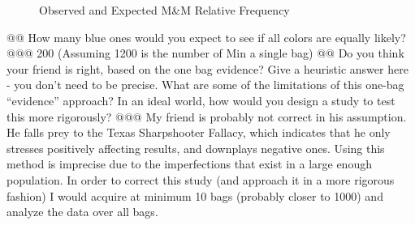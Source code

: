 \documentclass[10pt]{article}
\begin{document}
\begin{easylist}[enumerate]
\begin{figure}[ht]
            \caption{Observed and Expected M\&M Relative Frequency}
            \label{fig:mnms}
        \end{figure}
    @@ How many blue ones would you expect to see if all colors are equally likely?
    @@@ 200 (Assuming 1200 is the number of M\@Ms in a single bag)
    @@ Do you think your friend is right, based on the one bag evidence? Give a heuristic answer here - you don't need to be precise. What are some of the limitations of this one-bag ``evidence'' approach? In an ideal world, how would you design a study to test this more rigorously?
    @@@ My friend is probably not correct in his assumption. He falls prey to the Texas Sharpshooter Fallacy, which indicates that he only stresses positively affecting results, and downplays negative ones. Using this method is imprecise due to the imperfections that exist in a large enough population. In order to correct this study (and approach it in a more rigorous fashion) I would acquire at minimum 10 bags (probably closer to 1000) and analyze the data over all bags.


\end{easylist}
\end{document}

